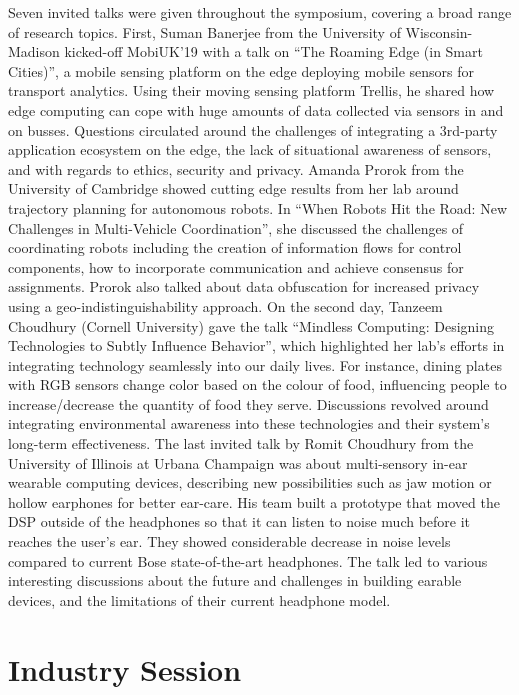 \documentclass[conference]{IEEEtran}
\begin{document}
Seven invited talks were given throughout the symposium, covering a broad range of research topics. First, Suman Banerjee from the University of Wisconsin-Madison kicked-off MobiUK’19 with a talk on “The Roaming Edge (in Smart Cities)”, a mobile sensing platform on the edge deploying mobile sensors for transport analytics. Using their moving sensing platform Trellis, he shared how edge computing can cope with huge amounts of data collected via sensors in and on busses. Questions circulated around the challenges of integrating a 3rd-party application ecosystem on the edge, the lack of situational awareness of sensors, and with regards to ethics, security and privacy. 
Amanda Prorok from the University of Cambridge showed cutting edge results from her lab around  trajectory planning for autonomous robots. In “When Robots Hit the Road: New Challenges in Multi-Vehicle Coordination”, she discussed the challenges of coordinating robots including the creation of information flows for control components, how to incorporate communication and achieve consensus for assignments. Prorok also talked about data obfuscation for increased privacy using a geo-indistinguishability approach.
On the second day, Tanzeem Choudhury (Cornell University) gave the talk  “Mindless Computing: Designing Technologies to Subtly Influence Behavior”, which highlighted her lab’s efforts in integrating technology seamlessly into our daily lives. For instance, dining plates with RGB sensors change color based on the colour of food, influencing people to increase/decrease the quantity of food they serve. Discussions revolved around integrating environmental awareness into these technologies and their system’s long-term effectiveness.
The last invited talk by Romit Choudhury from the University of Illinois at Urbana Champaign was about multi-sensory in-ear wearable computing devices, describing new possibilities such as jaw motion or hollow earphones for better ear-care. His team built a prototype that moved the DSP outside of the headphones so that it can listen to noise much before it reaches the user's ear. They showed considerable decrease in noise levels compared to current Bose state-of-the-art headphones. The talk led to various interesting discussions about the future and challenges in building earable devices, and the limitations of their current headphone model.



\section{Industry Session}
\end{document}

